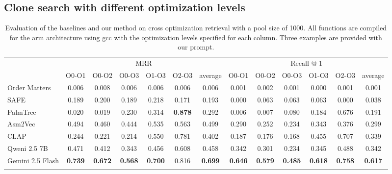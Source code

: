 \documentclass[conference,compsoc]{IEEEtran}
\begin{document}
\subsection{Clone search with different optimization levels}

{
    \renewcommand{\arraystretch}{1.3}

    \begin{table}[!t]
    \centering
    \begin{tabular}{l|cccccc|cccccc}
    \Xhline{2\arrayrulewidth}
    \multirow{2}{*}{Model} & \multicolumn{6}{c|}{MRR}                                  & \multicolumn{6}{c}{Recall @ 1}                                                        \\ \cline{2-13}
                           & O0-O1     & O0-O2     & O0-O3     & O1-O3     & O2-O3     & average     & O0-O1     & O0-O2     & O0-O3     & O1-O3     & O2-O3     & average     \\ \hline
    Order Matters          & 0.006     & 0.008     & 0.006     & 0.006     & 0.006     & 0.006       & 0.001     & 0.002     & 0.001     & 0.000     & 0.001     & 0.001       \\
    SAFE                   & 0.189     & 0.200     & 0.189     & 0.218     & 0.171     & 0.193       & 0.000     & 0.063     & 0.063     & 0.063     & 0.000     & 0.038       \\
    PalmTree               & 0.020     & 0.019     & 0.230     & 0.314     & \bf 0.878 & 0.292       & 0.006     & 0.007     & 0.080     & 0.184     & 0.676     & 0.191       \\
    Asm2Vec                & 0.494     & 0.460     & 0.444     & 0.535     & 0.563     & 0.499       & 0.290     & 0.252     & 0.234     & 0.343     & 0.376     & 0.299       \\
    CLAP                   & 0.244     & 0.221     & 0.214     & 0.550     & 0.781     & 0.402       & 0.187     & 0.176     & 0.168     & 0.455     & 0.707     & 0.339       \\ \hline
    Qweni 2.5 7B           & 0.471     & 0.412     & 0.343     & 0.456     & 0.608     & 0.458       & 0.342     & 0.301     & 0.234     & 0.345     & 0.488     & 0.342       \\
    Gemini 2.5 Flash       & \bf 0.739 & \bf 0.672 & \bf 0.568 & \bf 0.700 & 0.816     & \bf 0.699   & \bf 0.646 & \bf 0.579 & \bf 0.485 & \bf 0.618 & \bf 0.758 & \bf 0.617   \\ \Xhline{2\arrayrulewidth}
    \end{tabular}
    \caption{Evaluation of the baselines and our method on cross optimization retrieval with a pool size of 1000.
    All functions are compiled for the arm architecture using gcc with the optimization levels specified for each column.
    Three examples are provided with our prompt.}
    \label{x-opt}
    \end{table}
}
\end{document}
